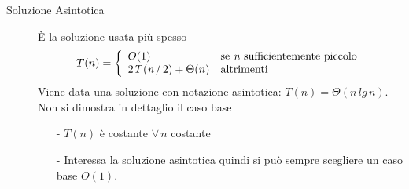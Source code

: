\documentclass[10pt, a4paper]{report}
\begin{document}
\begin{description}
\item[Soluzione Asintotica] È la soluzione usata più spesso
\begin{equation*}
T(n) = \left\{
\begin{array}{ll}
O(1) & \text{se \textit{n} sufficientemente piccolo} \\
2\textit{T\,}(\textit{n}\,/\,2) + \Theta(n) & \text{altrimenti}
\end{array}\right.
\end{equation*}
Viene data una soluzione con notazione asintotica: $T(n) = \Theta(n\,lg\,n)$. Non si dimostra in dettaglio il caso base
\begin{itemize}
\item[-]$T(n)$ è costante $\forall \,n$ costante
\item[-]Interessa la soluzione asintotica quindi si può sempre scegliere un caso base $O(1)$. 
\end{itemize}
\end{description}
\end{document}
